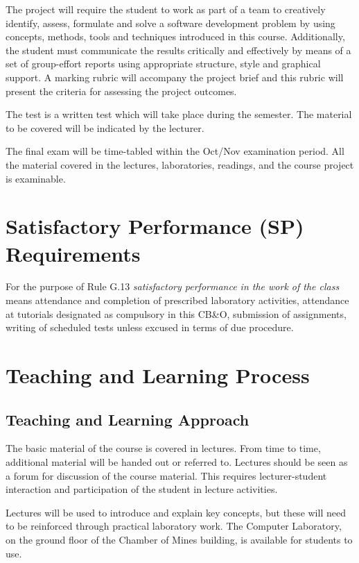 \documentclass[11pt]{eie-cbo}
\begin{document}
The project will require the student to work as part of a team to creatively identify, assess, formulate and solve a software development problem by using concepts, methods, tools and techniques introduced in this course. Additionally, the student must communicate the results critically and effectively by means of a set of group-effort reports using appropriate structure, style and graphical support. A marking rubric will accompany the project brief and this rubric will present the criteria for assessing the project outcomes. 

The test is a written test which will take place during the semester. The material to be covered will be indicated by the lecturer.

The final exam will be time-tabled within the Oct/Nov examination period. All the material covered in the lectures, laboratories, readings, and the course project is examinable. 

\section{Satisfactory Performance (SP) Requirements}\label{SP}
For the purpose of Rule G.13 \emph{satisfactory performance in the work of the class} means attendance and completion of prescribed laboratory activities, attendance at tutorials designated as compulsory in this CB\&O, submission of assignments, writing of scheduled tests unless excused in terms of due procedure.  

\section{Teaching and Learning Process}\label{teaching}
\subsection{Teaching and Learning Approach}
The basic material of the course is covered in lectures. From time to time,
additional material will be handed out or referred to. Lectures should be seen
as a forum for discussion of the course material. This requires
lecturer-student interaction and participation of the student in lecture
activities.

Lectures will be used to introduce and explain key concepts, but these will
need to be reinforced through practical laboratory work. The Computer
Laboratory, on the ground floor of the Chamber of Mines building, is available for students to use. 
\end{document}
